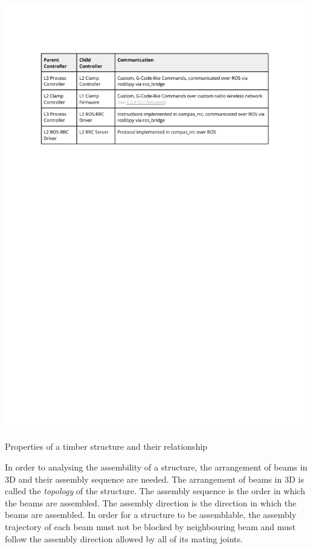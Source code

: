 \begin{table}[H]
    \includegraphics[page=2, trim=25.4mm 230mm 25.4mm 25.4mm, clip, width=0.98\textwidth]{tables/Tables in Chapter 5.pdf}
    \caption{Properties of a timber structure and their relationship}
    \label{table:properties-of-a-timber-structure}
\end{table}

In order to analysing the assembility of a structure, the arrangement of beams in 3D and their assembly sequence are needed. The arrangement of beams in 3D is called the \textit{topology} of the structure. The assembly sequence is the order in which the beams are assembled. The assembly direction is the direction in which the beams are assembled. In order for a structure to be assemblable, the assembly trajectory of each beam must not be blocked by  neighbouring beam and must follow the assembly direction allowed by all of its mating joints.

